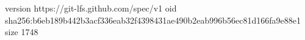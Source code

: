 version https://git-lfs.github.com/spec/v1
oid sha256:b6eb189b442b3acf336eab32f4398431ae490b2eab996b56ec81d166fa9e88e1
size 1748
